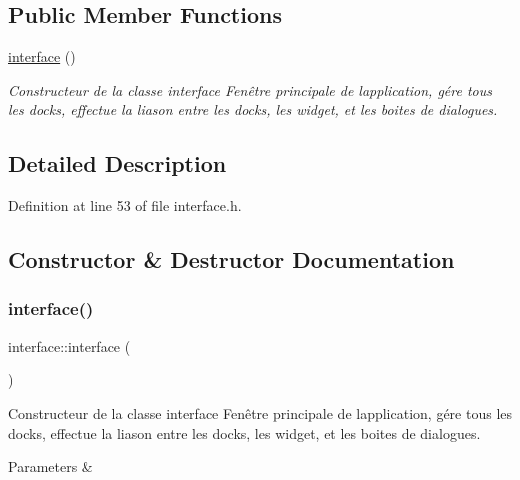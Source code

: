 \subsection*{Public Member Functions}
\begin{DoxyCompactItemize}
\item 
\hyperlink{classinterface_a13e0ee4b9df1714d747d62ec46220c55}{interface} ()
\begin{DoxyCompactList}\small\item\em Constructeur de la classe interface Fenêtre principale de l\textquotesingle{}application, gére tous les docks, effectue la liason entre les docks, les widget, et les boites de dialogues. \end{DoxyCompactList}\end{DoxyCompactItemize}


\subsection{Detailed Description}


Definition at line 53 of file interface.\+h.



\subsection{Constructor \& Destructor Documentation}
\mbox{\label{classinterface_a13e0ee4b9df1714d747d62ec46220c55}} 
\subsubsection{\texorpdfstring{interface()}{interface()}}
{\footnotesize\ttfamily interface\+::interface (\begin{DoxyParamCaption}{ }\end{DoxyParamCaption})}



Constructeur de la classe interface Fenêtre principale de l\textquotesingle{}application, gére tous les docks, effectue la liason entre les docks, les widget, et les boites de dialogues. 


\begin{DoxyParams}{Parameters}
{\em } & \\
\hline
\end{DoxyParams}


